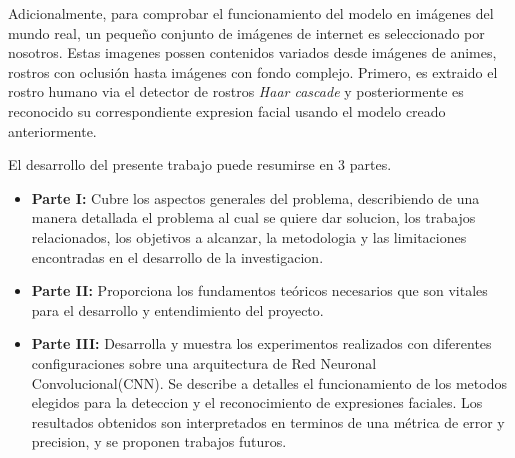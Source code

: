 Adicionalmente, para comprobar el funcionamiento del modelo en imágenes del mundo real, un pequeño conjunto de imágenes de internet es seleccionado por nosotros. Estas imagenes possen contenidos variados desde imágenes de animes, rostros con oclusión hasta imágenes con fondo complejo. Primero, es extraido el rostro humano via el detector de rostros \textit{Haar cascade} y posteriormente es reconocido su correspondiente expresion facial usando el modelo creado anteriormente.

El desarrollo del presente trabajo puede resumirse en 3 partes.

\begin{itemize}
\item \textbf{Parte I:} Cubre los aspectos generales del problema, describiendo de una manera detallada el problema al cual se quiere dar solucion, los trabajos relacionados, los objetivos a alcanzar, la metodologia y las limitaciones encontradas en el desarrollo de la investigacion.
\item \textbf{Parte II:} Proporciona los fundamentos teóricos necesarios que son vitales para el desarrollo y entendimiento del proyecto.
\item \textbf{Parte III:} Desarrolla y muestra los experimentos realizados con diferentes configuraciones sobre una arquitectura de Red Neuronal Convolucional(CNN). Se describe a detalles el funcionamiento de los metodos elegidos para la deteccion y el reconocimiento de expresiones faciales. Los resultados obtenidos son interpretados en terminos de una métrica de error y precision, y se proponen trabajos futuros.

 
 
  
\end{itemize}





